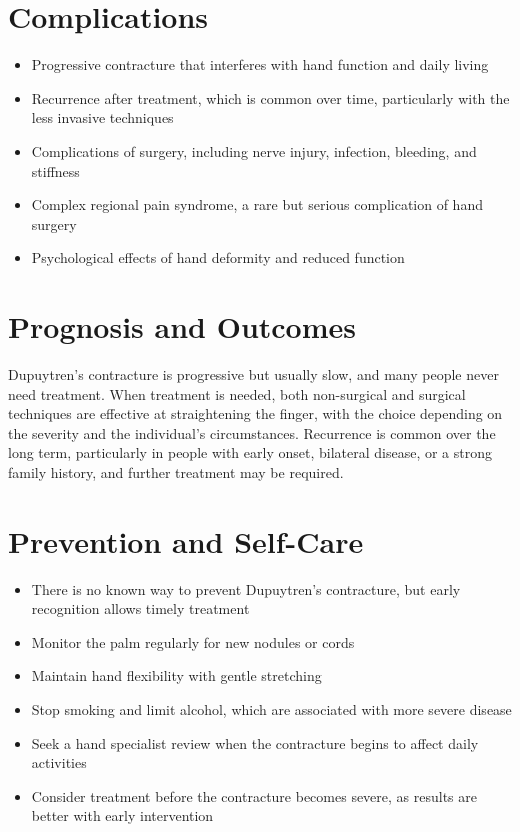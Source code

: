 \section*{Complications}
\begin{itemize}
    \item Progressive contracture that interferes with hand function and daily living
    \item Recurrence after treatment, which is common over time, particularly with the less invasive techniques
    \item Complications of surgery, including nerve injury, infection, bleeding, and stiffness
    \item Complex regional pain syndrome, a rare but serious complication of hand surgery
    \item Psychological effects of hand deformity and reduced function
\end{itemize}

\section*{Prognosis and Outcomes}
Dupuytren's contracture is progressive but usually slow, and many people never need treatment. When treatment is needed, both non-surgical and surgical techniques are effective at straightening the finger, with the choice depending on the severity and the individual's circumstances. Recurrence is common over the long term, particularly in people with early onset, bilateral disease, or a strong family history, and further treatment may be required.

\section*{Prevention and Self-Care}
\begin{itemize}
    \item There is no known way to prevent Dupuytren's contracture, but early recognition allows timely treatment
    \item Monitor the palm regularly for new nodules or cords
    \item Maintain hand flexibility with gentle stretching
    \item Stop smoking and limit alcohol, which are associated with more severe disease
    \item Seek a hand specialist review when the contracture begins to affect daily activities
    \item Consider treatment before the contracture becomes severe, as results are better with early intervention
\end{itemize}

